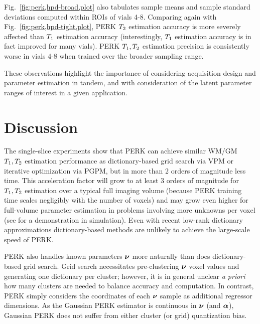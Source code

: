 Fig.~\ref{fig:perk,hpd-broad,plot}
also tabulates sample means and sample standard deviations
computed within ROIs of vials 4-8.
Comparing again with Fig.~\ref{fig:perk,hpd-tight,plot},
PERK $T_2$ estimation accuracy
is more severely affected 
than $T_1$ estimation accuracy
(interestingly,
$T_1$ estimation accuracy 
is in fact improved for many vials).
PERK $T_1,T_2$ estimation precision
is consistently worse in vials 4-8
when trained over the broader sampling range.

These observations highlight the importance 
of considering acquisition design
and parameter estimation in tandem,
and with consideration
of the latent parameter ranges of interest
in a given application.

\section{Discussion}
\label{s,perk,disc}

The single-slice experiments show
that PERK can achieve similar 
WM/GM $T_1,T_2$ estimation performance 
as dictionary-based grid search via VPM
or iterative optimization via PGPM,
but in more than 2 orders of magnitude less time.
This acceleration factor will grow
to at least 3 orders of magnitude 
for $T_1,T_2$ estimation 
over a typical full imaging volume
(because PERK training time scales negligibly 
with the number of voxels) and
may grow even higher
for full-volume parameter estimation
in problems involving 
more unknowns per voxel 
(see \cite{nataraj:17:dfm}
for a demonstration in simulation).
Even with recent low-rank dictionary approximations 
\cite{%
	mcgivney:14:scf,%
	cauley:15:fgm,%
	asslander:18:lra,%
	yang:18:lra%
}
dictionary-based methods are unlikely 
to achieve the large-scale speed 
of PERK.

PERK also handles known parameters $\boldsymbol{\nu}$ more naturally
than does dictionary-based grid search.
Grid search necessitates pre-clustering $\boldsymbol{\nu}$ voxel values
and generating one dictionary per cluster;
however,
it is in general unclear \emph{a priori} 
how many clusters are needed
to balance accuracy and computation.
In contrast,
PERK simply considers the coordinates 
of each $\boldsymbol{\nu}$ sample
as additional regressor dimensions.
As the Gaussian PERK estimator 
is continuous in $\boldsymbol{\nu}$ (and $\boldsymbol{\alpha}$),
Gaussian PERK does not suffer 
from either cluster (or grid) 
quantization bias.

